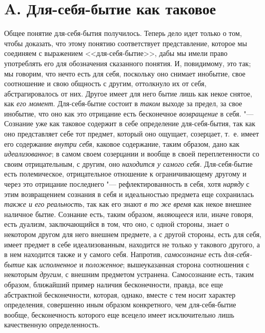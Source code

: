 \section[A. Для-себя-бытие как таковое]{A. Для-себя-бытие как таковое}
Общее понятие для-себя-бытия получилось. Теперь дело идет только о том,
чтобы доказать, что этому понятию соответствует представление, которое мы
соединяем с выражением <<для-себя-бытие>>, дабы мы имели право употреблять
его для обозначения сказанного понятия. И, повидимому, это так; мы говорим,
что нечто есть для себя, поскольку оно снимает инобытие, свое соотношение и
свою общность с другим, оттолкнуло их от себя, абстрагировалось от них.
Другое имеет для него бытие лишь как некое снятое, как
{\em его момент}. Для-себя-бытие состоит в
{\em таком} выходе за предел, за свое инобытие, что оно
как это отрицание есть бесконечное {\em возвращение} в
себя. "--- Сознание уже как таковое содержит в себе определение
для-себя-бытия, так как оно представляет себе тот предмет, который оно
ощущает, созерцает, т.~е. имеет его содержание
{\em внутри себя}, каковое содержание, таким образом,
дано как {\em идеализованное}; в самом своем созерцании
и вообще в своей переплетенности со своим отрицательным, с другим, оно
{\em находится у самого себя}. Для-себя-бытие есть
полемическое, отрицательное отношение к ограничивающему другому и через это
отрицание последнего "--- рефлектированность в себя, хотя
{\em наряду} с этим возвращением сознания в себя и
идеальностью предмета еще сохранилась {\em также и его
реальность}, так как его знают {\em в то же время} как
некое внешнее наличное бытие. Сознание есть, таким образом,
{\em являющееся} или, иначе говоря, есть дуализм,
заключающийся в том, что оно, с одной стороны, знает о некотором другом для
него внешнем предмете, а с другой стороны, есть для себя, имеет предмет в
себе идеализованным, находится не только у такового другого, а в нем
находится также и у самого себя. Напротив, {\em самосознание} есть
{\em для-себя-бытие} как {\em исполненное} и
{\em положенное}; вышеуказанная сторона соотношения с
некоторым {\em другим}, с внешним предметом устранена.
Самосознание есть, таким образом, ближайший пример наличия бесконечности,
правда, все еще абстрактной бесконечности, которая, однако, вместе с тем
носит характер определения, совершенно иным образом конкретного, чем
для-себя-бытие вообще, бесконечность которого еще всецело имеет
исключительно лишь качественную определенность.


